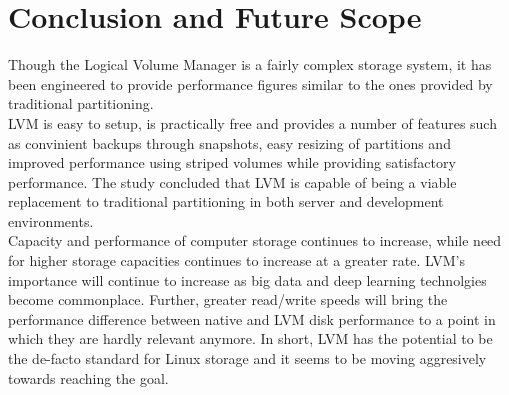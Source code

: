 \chapter{Conclusion and Future Scope}
Though the Logical Volume Manager is a fairly complex storage system, it has
been engineered to provide performance figures similar to the ones provided by
traditional partitioning.\\ 

LVM is easy to setup, is practically free and provides a number of features such
as convinient backups through snapshots, easy resizing of partitions and
improved performance using striped volumes while providing satisfactory
performance. The study concluded that LVM is capable of being a viable
replacement to traditional partitioning in both server and development
environments.\\ 

Capacity and performance of computer storage continues to increase, while need
for higher storage capacities continues to increase at a greater rate. LVM's
importance will continue to increase as big data and deep learning technolgies
become commonplace. Further, greater read/write speeds will bring the
performance difference between native and LVM disk performance to a point in
which they are hardly relevant anymore. In short, LVM has the potential to be
the de-facto standard for Linux storage and it seems to be moving aggresively
towards reaching the goal.
